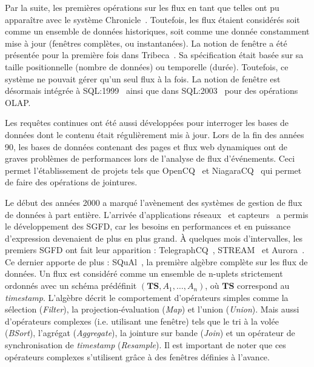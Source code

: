 Par la suite, les premières opérations sur les flux en tant que telles ont pu apparaître avec le système Chronicle~\cite{Jagadish:chronicle}. Toutefois, les flux étaient considérés soit comme un ensemble de données historiques, soit comme une donnée constamment mise à jour (fenêtres complètes, ou instantanées). La notion de fenêtre a été présentée pour la première fois dans Tribeca~\cite{Sullivan:tribeca,Sullivan:tribeca2}. Sa spécification était basée sur sa taille positionnelle (nombre de données) ou temporelle (durée). Toutefois, ce système ne pouvait gérer qu'un seul flux à la fois. La notion de fenêtre est désormais intégrée à SQL:1999~\cite{Melton:sql1999} ainsi que dans SQL:2003~\cite{Eisenberg:sql2003} pour des opérations OLAP.

Les requêtes continues ont été aussi développées pour interroger les bases de données dont le contenu était régulièrement mis à jour. Lors de la fin des années 90, les bases de données contenant des pages et flux web dynamiques ont de graves problèmes de performances lors de l'analyse de flux d'événements. Ceci permet l'établissement de projets tels que OpenCQ~\cite{Liu:opencq} et NiagaraCQ~\cite{Chen:niagaracq} qui permet de faire des opérations de jointures.

Le début des années 2000 a marqué l'avènement des systèmes de gestion de flux de données à part entière. L'arrivée d'applications réseaux~\cite{Cranor:gigascope} et capteurs~\cite{Madden:tag,Yao:cougar} a permis le développement des SGFD, car les besoins en performances et en puissance d'expression devenaient de plus en plus grand. À quelques mois d'intervalles, les premiers SGFD ont fait leur apparition : TelegraphCQ~\cite{Chandrasekaran:telegraphcq}, STREAM~\cite{Widom:queries} et Aurora~\cite{Carney:monitoring}. Ce dernier apporte de plus : SQuAl~\cite{Abadi:aurora}, la première algèbre complète sur les flux de données. Un flux est considéré comme un ensemble de n-uplets strictement ordonnés avec un schéma prédéfinit $(\textbf{TS}, A_1,\dots, A_n)$, où $\textbf{TS}$ correspond au \textit{timestamp}. L'algèbre décrit le comportement d'opérateurs simples comme la sélection (\textit{Filter}), la projection-évaluation (\textit{Map}) et l'union (\textit{Union}). Mais aussi d'opérateurs complexes (i.e. utilisant une fenêtre) tels que le tri à la volée (\textit{BSort}), l'agrégat (\textit{Aggregate}), la jointure sur bande (\textit{Join}) et un opérateur de synchronisation de \textit{timestamp} (\textit{Resample}). Il est important de noter que ces opérateurs complexes s'utilisent grâce à des fenêtres définies à l'avance.

